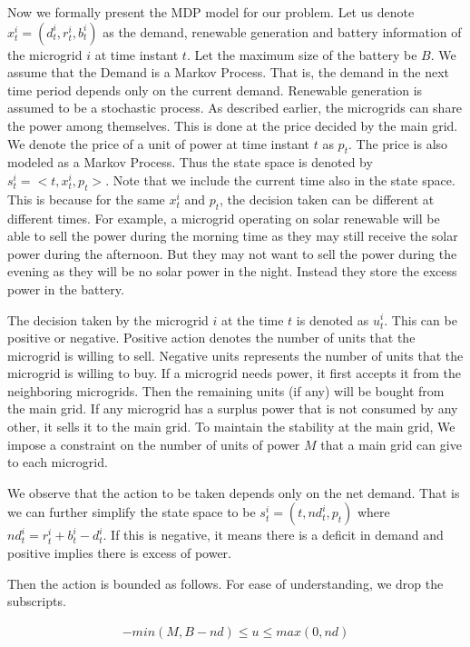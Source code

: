 Now we formally present the MDP model for our problem. Let us denote $x_{t}^{i} = (d_{t}^{i},r_{t}^{i},b_{t}^{i})$  as the demand, renewable generation and battery information of the microgrid $i$ at time instant $t$. Let the maximum size of the battery be $B$. We assume that the Demand is a Markov Process. That is, the demand in the next time period depends only on the current demand. Renewable generation is assumed to be a stochastic process. As described earlier, the microgrids can share the power among themselves. This is done at the price decided by the main grid. We denote the price of a unit of power at time instant $t$ as $p_{t}$. The price is also modeled as a Markov Process. Thus the state space is denoted by $s_{t}^{i} = <t,x_{t}^{i},p_{t}>$. Note that we include the current time also in the state space. This is because for the same $x_{t}^{i}$ and $p_{t}$, the decision taken can be different at different times. For example, a microgrid operating on solar renewable will be able to sell the power during the morning time as they may still receive the solar power during the afternoon. But they may not want to sell the power during the evening as they will be no solar power in the night. Instead they store the excess power in the battery.

The decision taken by the microgrid $i$ at the time $t$ is denoted as $u_{t}^{i}$. This can be positive or negative. Positive action denotes the number of units that the microgrid is willing to sell. Negative units represents the number of units that the microgrid is willing to buy. If a microgrid needs power, it first accepts it from the neighboring microgrids. Then the remaining units (if any) will be bought from the main grid. If any microgrid has a surplus power that is not consumed by any other, it sells it to the main grid. To maintain the stability at the main grid, We impose a constraint on the number of units of power $M$ that a main grid can give to each microgrid. 

We observe that the action to be taken depends only on the net demand. That is we can further simplify the state space to be $s_{t}^{i} = (t,nd_{t}^{i},p_{t})$ where $nd_{t}^{i} = r_{t}^{i} + b_{t}^{i} - d_{t}^{i}$. If this is negative, it means there is a deficit in demand and positive implies there is excess of power.

Then the action is bounded as follows. For ease of understanding, we drop the subscripts.  

\begin{align}
-min(M, B - nd) \leq u \leq max(0, nd)
\end{align}

